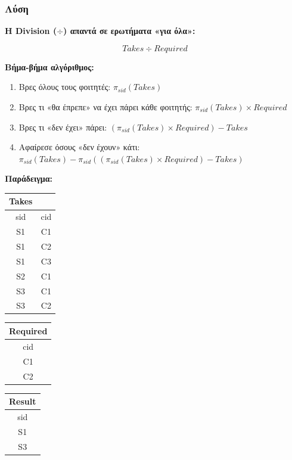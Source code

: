\subsubsection*{Λύση}

\textbf{Η Division ($\div$) απαντά σε ερωτήματα «για όλα»:}

$$Takes \div Required$$

\textbf{Βήμα-βήμα αλγόριθμος:}

\begin{enumerate}
    \item Βρες όλους τους φοιτητές: $\pi_{sid}(Takes)$
    \item Βρες τι «θα έπρεπε» να έχει πάρει κάθε φοιτητής: $\pi_{sid}(Takes) \times Required$
    \item Βρες τι «δεν έχει» πάρει: $(\pi_{sid}(Takes) \times Required) - Takes$
    \item Αφαίρεσε όσους «δεν έχουν» κάτι: $\pi_{sid}(Takes) - \pi_{sid}((\pi_{sid}(Takes) \times Required) - Takes)$
\end{enumerate}

\textbf{Παράδειγμα:}

\begin{center}
\begin{tabular}{cc}
\textbf{Takes} & \\
\toprule
sid & cid \\
\midrule
S1 & C1 \\
S1 & C2 \\
S1 & C3 \\
S2 & C1 \\
S3 & C1 \\
S3 & C2 \\
\bottomrule
\end{tabular}
\quad\quad
\begin{tabular}{c}
\textbf{Required} \\
\toprule
cid \\
\midrule
C1 \\
C2 \\
\bottomrule
\end{tabular}
\quad\quad
\begin{tabular}{c}
\textbf{Result} \\
\toprule
sid \\
\midrule
S1 \\
S3 \\
\bottomrule
\end{tabular}
\end{center}

